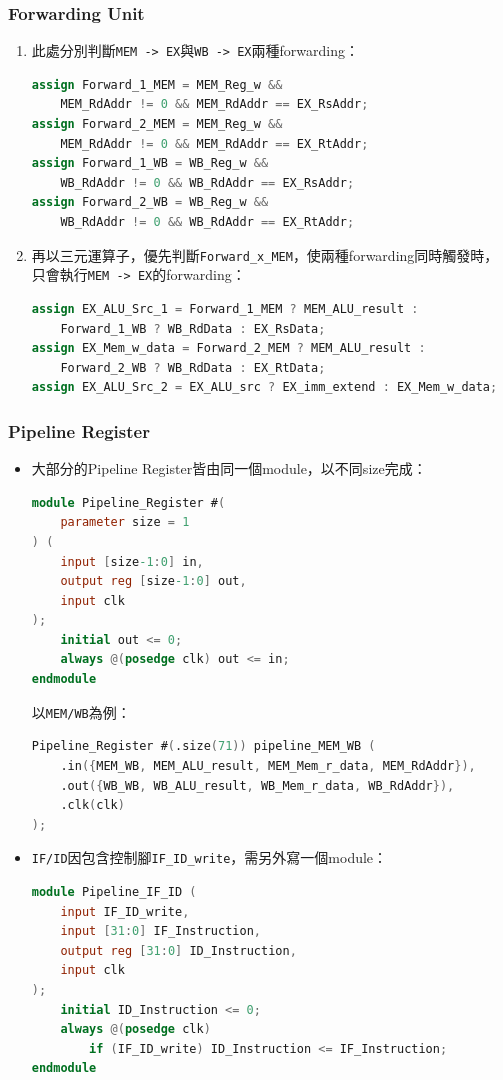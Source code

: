 \documentclass[12pt]{article}
\begin{document}
\subsubsection{Forwarding Unit}
\begin{enumerate}
    \item 此處分別判斷\texttt{MEM -> EX}與\texttt{WB -> EX}兩種forwarding：
    \begin{lstlisting}[language=Verilog]
assign Forward_1_MEM = MEM_Reg_w && 
    MEM_RdAddr != 0 && MEM_RdAddr == EX_RsAddr;
assign Forward_2_MEM = MEM_Reg_w && 
    MEM_RdAddr != 0 && MEM_RdAddr == EX_RtAddr;
assign Forward_1_WB = WB_Reg_w && 
    WB_RdAddr != 0 && WB_RdAddr == EX_RsAddr;
assign Forward_2_WB = WB_Reg_w && 
    WB_RdAddr != 0 && WB_RdAddr == EX_RtAddr;
    \end{lstlisting}
    \item 再以三元運算子，優先判斷\texttt{Forward\_x\_MEM}，使兩種forwarding同時觸發時，只會執行\texttt{MEM -> EX}的forwarding：
    \begin{lstlisting}[language=Verilog]
assign EX_ALU_Src_1 = Forward_1_MEM ? MEM_ALU_result : 
    Forward_1_WB ? WB_RdData : EX_RsData;
assign EX_Mem_w_data = Forward_2_MEM ? MEM_ALU_result : 
    Forward_2_WB ? WB_RdData : EX_RtData;
assign EX_ALU_Src_2 = EX_ALU_src ? EX_imm_extend : EX_Mem_w_data;
    \end{lstlisting}
\end{enumerate}

\subsubsection{Pipeline Register}
\begin{itemize}
    \item 大部分的Pipeline Register皆由同一個module，以不同size完成：
    \begin{lstlisting}[language=Verilog]
module Pipeline_Register #(
    parameter size = 1
) (
    input [size-1:0] in,
    output reg [size-1:0] out,
    input clk
);
    initial out <= 0;
    always @(posedge clk) out <= in;
endmodule
    \end{lstlisting}
    以\texttt{MEM/WB}為例：
    \begin{lstlisting}[language=Verilog]
Pipeline_Register #(.size(71)) pipeline_MEM_WB (
    .in({MEM_WB, MEM_ALU_result, MEM_Mem_r_data, MEM_RdAddr}),
    .out({WB_WB, WB_ALU_result, WB_Mem_r_data, WB_RdAddr}),
    .clk(clk)
);
    \end{lstlisting}
    \item \texttt{IF/ID}因包含控制腳\texttt{IF\_ID\_write}，需另外寫一個module：
    \begin{lstlisting}[language=Verilog]
module Pipeline_IF_ID (
    input IF_ID_write,
    input [31:0] IF_Instruction,
    output reg [31:0] ID_Instruction,
    input clk
);
    initial ID_Instruction <= 0;
    always @(posedge clk) 
        if (IF_ID_write) ID_Instruction <= IF_Instruction;
endmodule
    \end{lstlisting}
\end{itemize}
\end{document}
